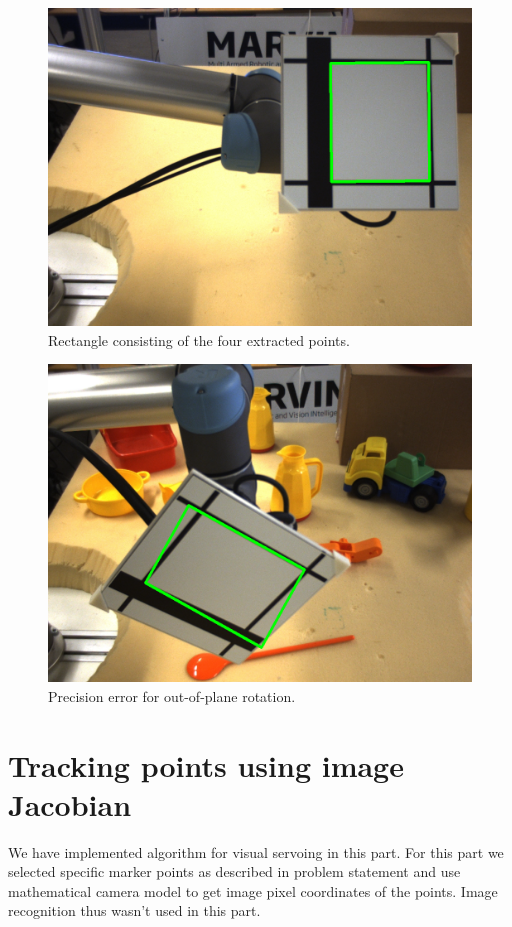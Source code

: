 \documentclass[]{scrartcl}
\begin{document}
\begin{figure}
	\centering
	\includegraphics[width=0.7\linewidth]{fig/src1-1.png}
	\caption{Rectangle consisting of the four extracted points.}
	\label{fig:src2}
\end{figure}

\begin{figure}
	\centering
	\includegraphics[width=0.7\linewidth]{fig/src1-63.png}
	\caption{Precision error for out-of-plane rotation.}
	\label{fig:err2}
\end{figure}

\clearpage
\section{Tracking points using image Jacobian}
We have implemented algorithm for visual servoing in this part. For this part we selected specific marker points as described in problem statement and use mathematical camera model to get image pixel coordinates of the points. Image recognition thus wasn't used in this part.
\end{document}
